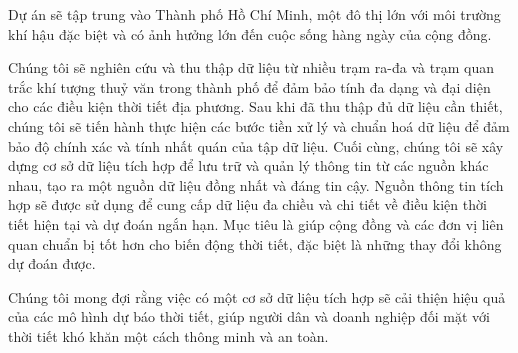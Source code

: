 
Dự án sẽ tập trung vào Thành phố Hồ Chí Minh, một đô thị lớn với môi trường khí hậu đặc biệt và có ảnh hưởng lớn đến cuộc sống hàng ngày của cộng đồng. 


Chúng tôi sẽ nghiên cứu và thu thập dữ liệu từ nhiều trạm ra-đa và trạm quan trắc khí tượng thuỷ văn trong thành phố để đảm bảo tính đa dạng và đại diện cho các điều kiện thời tiết địa phương. Sau khi đã thu thập đủ dữ liệu cần thiết, chúng tôi sẽ tiến hành thực hiện các bước tiền xử lý và chuẩn hoá dữ liệu để đảm bảo độ chính xác và tính nhất quán của tập dữ liệu. Cuối cùng, chúng tôi sẽ xây dựng cơ sở dữ liệu tích hợp để lưu trữ và quản lý thông tin từ các nguồn khác nhau, tạo ra một nguồn dữ liệu đồng nhất và đáng tin cậy. Nguồn thông tin tích hợp sẽ được sử dụng để cung cấp dữ liệu đa chiều và chi tiết về điều kiện thời tiết hiện tại và dự đoán ngắn hạn. Mục tiêu là giúp cộng đồng và các đơn vị liên quan chuẩn bị tốt hơn cho biến động thời tiết, đặc biệt là những thay đổi không dự đoán được.


Chúng tôi mong đợi rằng việc có một cơ sở dữ liệu tích hợp sẽ cải thiện hiệu quả của các mô hình dự báo thời tiết, giúp người dân và doanh nghiệp đối mặt với thời tiết khó khăn một cách thông minh và an toàn.

    
    
